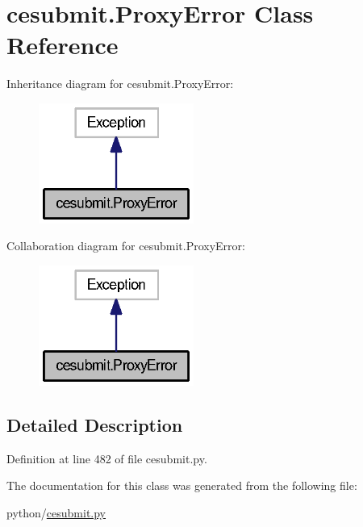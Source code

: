 \section{cesubmit.\-Proxy\-Error Class Reference}
\label{classcesubmit_1_1ProxyError}


Inheritance diagram for cesubmit.\-Proxy\-Error\-:
\nopagebreak
\begin{figure}[H]
\begin{center}
\leavevmode
\includegraphics[width=144pt]{classcesubmit_1_1ProxyError__inherit__graph}
\end{center}
\end{figure}


Collaboration diagram for cesubmit.\-Proxy\-Error\-:
\nopagebreak
\begin{figure}[H]
\begin{center}
\leavevmode
\includegraphics[width=144pt]{classcesubmit_1_1ProxyError__coll__graph}
\end{center}
\end{figure}


\subsection{Detailed Description}


Definition at line 482 of file cesubmit.\-py.



The documentation for this class was generated from the following file\-:\begin{DoxyCompactItemize}
\item 
python/\hyperlink{cesubmit_8py}{cesubmit.\-py}\end{DoxyCompactItemize}
